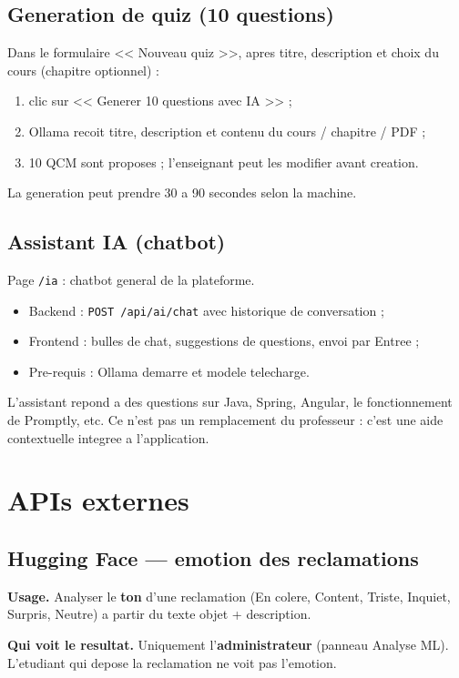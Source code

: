 \subsection{Generation de quiz (10 questions)}

Dans le formulaire << Nouveau quiz >>, apres titre, description et choix
du cours (chapitre optionnel) :
\begin{enumerate}
  \item clic sur << Generer 10 questions avec IA >> ;
  \item Ollama recoit titre, description et contenu du cours / chapitre / PDF ;
  \item 10 QCM sont proposes ; l'enseignant peut les modifier avant creation.
\end{enumerate}
La generation peut prendre 30 a 90 secondes selon la machine.

\subsection{Assistant IA (chatbot)}

Page \texttt{/ia} : chatbot general de la plateforme.
\begin{itemize}
  \item Backend : \texttt{POST /api/ai/chat} avec historique de conversation ;
  \item Frontend : bulles de chat, suggestions de questions, envoi par Entree ;
  \item Pre-requis : Ollama demarre et modele telecharge.
\end{itemize}
L'assistant repond a des questions sur Java, Spring, Angular, le fonctionnement
de Promptly, etc. Ce n'est pas un remplacement du professeur : c'est une aide
contextuelle integree a l'application.

\section{APIs externes}

\subsection{Hugging Face --- emotion des reclamations}

\textbf{Usage.} Analyser le \textbf{ton} d'une reclamation (En colere, Content,
Triste, Inquiet, Surpris, Neutre) a partir du texte objet + description.

\textbf{Qui voit le resultat.} Uniquement l'\textbf{administrateur} (panneau
Analyse ML). L'etudiant qui depose la reclamation ne voit pas l'emotion.

